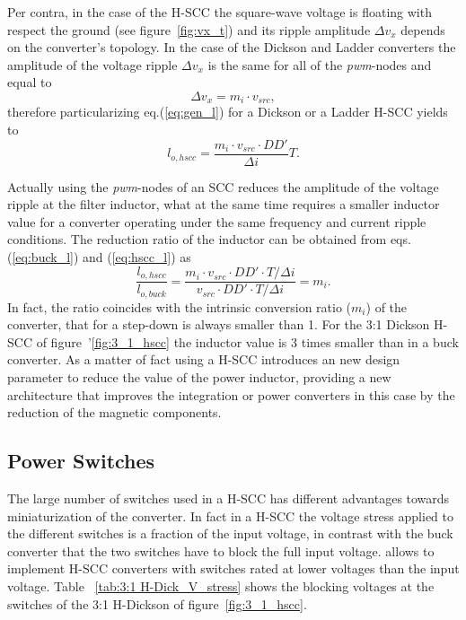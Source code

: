 Per contra, in the case of the H-SCC the square-wave voltage is floating with respect the ground (see figure~\ref{fig:vx_t}) and its ripple amplitude $\Delta v_x$ depends on the converter's topology. In the case of the Dickson and Ladder converters the amplitude of the voltage ripple $\Delta v_x$ is the same for all of the \emph{pwm}-nodes and equal to
\begin{equation}
 \Delta v_x   = m_i \cdot v_{src},
\label{eq:h_scc_Del_vx}
\end{equation}
therefore particularizing eq.(\ref{eq:gen_l}) for a Dickson or a Ladder H-SCC yields to
\begin{equation}
 l_{o,hscc}  = \frac{ m_i \cdot v_{src} \cdot DD'}{\Delta i} T.
\label{eq:hscc_l}
\end{equation}

Actually using the \emph{pwm}-nodes of an SCC reduces the amplitude of the voltage ripple at the filter inductor, what at the same time requires a smaller inductor value for a converter operating under the same frequency and current ripple conditions. The reduction ratio of the inductor can be obtained from eqs. (\ref{eq:buck_l}) and (\ref{eq:hscc_l}) as
\begin{equation}
 \frac{l_{o,hscc}}{l_{o,buck}} =  \frac{{ m_i \cdot v_{src} \cdot DD' \cdot T}/{\Delta i} }{{  v_{src} \cdot DD' \cdot T}/{\Delta i}} = m_i.
\label{eq:l_m}
\end{equation}
In fact, the ratio coincides with the intrinsic conversion ratio ($m_i$) of the converter, that for a step-down is always smaller than 1. For the 3:1 Dickson H-SCC of figure~'\ref{fig:3_1_hscc} the inductor value is 3 times smaller than in a buck converter. As a matter of fact using a H-SCC introduces an new design parameter to reduce the value of the power inductor, providing a new architecture that improves the integration or power converters in this case by the reduction of the magnetic components.

\subsection{Power Switches}
The large number of switches used in a H-SCC has different advantages towards miniaturization of the converter. In fact in a H-SCC the voltage stress applied to the different switches is a fraction of the input voltage, in contrast with the buck converter that the two switches have to block the full input voltage.  allows to implement H-SCC converters with switches rated at lower voltages than the input voltage. Table ~\ref{tab:3:1 H-Dick_V_stress} shows the blocking voltages at the switches of the 3:1 H-Dickson of figure~\ref{fig:3_1_hscc}.

